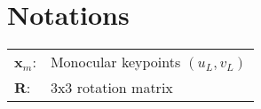  \section*{Notations}
 \newcommand{\notion}[2]{#1: & #2}
 \begin{table}[H]\setlength\tabcolsep{10pt}
     \begin{tabular}{ll}
     
     \notion{$\mathbf{x}_m$}{Monocular keypoints $ (u_L, v_L)$}\\
     \notion{$\mathbf{R}$}{3x3 rotation matrix}\\
     
     \end{tabular}
 \end{table}
